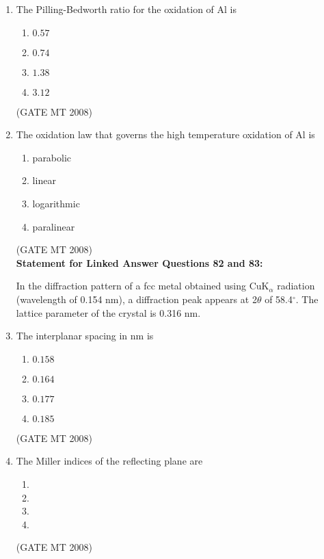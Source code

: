 \documentclass[11pt, letterpaper]{article}
\theoremstyle{remark}
\begin{document}
\begin{enumerate}
\item The Pilling-Bedworth ratio for the oxidation of Al is
\begin{multicols}{4}
\begin{enumerate} 
\item $0.57$
\item $0.74$
\item $1.38$
\item $3.12$
\end{enumerate}
\end{multicols}
\hfill(GATE MT 2008)
\item The oxidation law that governs the high temperature oxidation of Al is
\vspace{-0.9em}
\begin{multicols}{4}
\begin{enumerate} 
\item parabolic
\item linear
\item logarithmic
\item paralinear
\end{enumerate}
\end{multicols}
\hfill(GATE MT 2008)\\


\textbf{Statement for Linked Answer Questions 82 and 83:}

In the diffraction pattern of a fcc metal obtained using CuK$_\alpha$ radiation (wavelength of 0.154 nm), 
a diffraction peak appears at 2$\theta$ of 58.4$^\circ$. The lattice parameter of the crystal is 0.316 nm.

\item The interplanar spacing in nm is

\begin{multicols}{4}
\begin{enumerate} 
\item $0.158$
\item $0.164$
\item $0.177$
\item $0.185$
\end{enumerate}
\end{multicols}

\hfill(GATE MT 2008)

\item The Miller indices of the reflecting plane are
\vspace{-0.9em}
\begin{multicols}{4}
\begin{enumerate} 
\item {}
\item {}
\item {}
\item {}
\end{enumerate}
\end{multicols}
\hfill(GATE MT 2008)\\




\end{enumerate}
\end{document}
